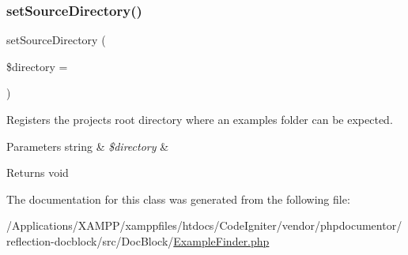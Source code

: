 \subsubsection{\texorpdfstring{set\+Source\+Directory()}{setSourceDirectory()}}
{\footnotesize\ttfamily set\+Source\+Directory (\begin{DoxyParamCaption}\item[{}]{\$directory = {\ttfamily \textquotesingle{}\textquotesingle{}} }\end{DoxyParamCaption})}

Registers the project\textquotesingle{}s root directory where an \textquotesingle{}examples\textquotesingle{} folder can be expected.


\begin{DoxyParams}[1]{Parameters}
string & {\em \$directory} & \\
\hline
\end{DoxyParams}
\begin{DoxyReturn}{Returns}
void 
\end{DoxyReturn}


The documentation for this class was generated from the following file\+:\begin{DoxyCompactItemize}
\item 
/\+Applications/\+X\+A\+M\+P\+P/xamppfiles/htdocs/\+Code\+Igniter/vendor/phpdocumentor/reflection-\/docblock/src/\+Doc\+Block/\mbox{\hyperlink{_example_finder_8php}{Example\+Finder.\+php}}\end{DoxyCompactItemize}
